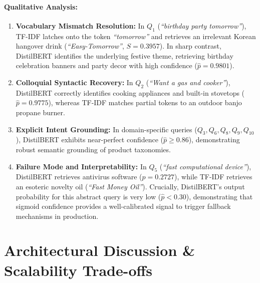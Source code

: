 \documentclass[11pt]{article}
\begin{document}
\paragraph{Qualitative Analysis:}
\begin{enumerate}
  \item \textbf{Vocabulary Mismatch Resolution:} In $Q_1$ (\textit{``birthday party tomorrow''}), TF-IDF latches onto the token \textit{``tomorrow''} and retrieves an irrelevant Korean hangover drink (\textit{``Easy-Tomorrow''}, $S = 0.3957$). In sharp contrast, DistilBERT identifies the underlying festive theme, retrieving birthday celebration banners and party decor with high confidence ($\hat{p} = 0.9801$).
  \item \textbf{Colloquial Syntactic Recovery:} In $Q_2$ (\textit{``Want a gas and cooker''}), DistilBERT correctly identifies cooking appliances and built-in stovetops ($\hat{p} = 0.9775$), whereas TF-IDF matches partial tokens to an outdoor banjo propane burner.
  \item \textbf{Explicit Intent Grounding:} In domain-specific queries ($Q_3, Q_6, Q_8, Q_9, Q_{10}$), DistilBERT exhibits near-perfect confidence ($\hat{p} \ge 0.86$), demonstrating robust semantic grounding of product taxonomies.
  \item \textbf{Failure Mode and Interpretability:} In $Q_5$ (\textit{``fast computational device''}), DistilBERT retrieves antivirus software ($\hat{p} = 0.2727$), while TF-IDF retrieves an esoteric novelty oil (\textit{``Fast Money Oil''}). Crucially, DistilBERT's output probability for this abstract query is very low ($\hat{p} < 0.30$), demonstrating that sigmoid confidence provides a well-calibrated signal to trigger fallback mechanisms in production.
\end{enumerate}

\section{Architectural Discussion \& Scalability Trade-offs}\label{sec:discussion}
\end{document}
